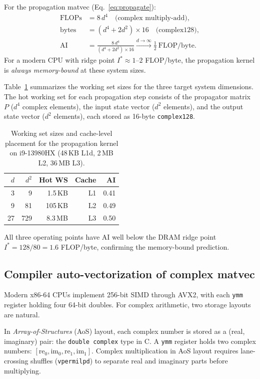 \documentclass[final,3p,times,twocolumn]{elsarticle}
\begin{document}
For the propagation matvec (Eq.~\eqref{eq:propagate}):
\begin{align}
  \text{FLOPs} &= 8\,d^4 \quad \text{(complex multiply-add)}, \\
  \text{bytes} &= (d^4 + 2d^2) \times 16 \quad \text{(complex128)}, \\
  \text{AI}    &= \frac{8\,d^4}{(d^4 + 2d^2) \times 16}
                \xrightarrow{d \to \infty} \frac{1}{2}\ \text{FLOP/byte}.
\end{align}
%
For a modern CPU with ridge point $I^* \approx 1$--$2$ FLOP/byte, the
propagation kernel is \emph{always memory-bound} at these system sizes.

Table~\ref{tab:working_set} summarizes the working set sizes for the three
target system dimensions. The hot working set for each propagation step
consists of the propagator matrix $P$ ($d^4$ complex elements), the input
state vector ($d^2$ elements), and the output state vector ($d^2$ elements),
each stored as 16-byte \texttt{complex128}.

\begin{table}[t]
  \centering
  \caption{Working set sizes and cache-level placement for the propagation
           kernel on i9-13980HX (48\,KB L1d, 2\,MB L2, 36\,MB L3).}
  \label{tab:working_set}
  \begin{tabular}{@{}rrrrr@{}}
    \toprule
    $d$ & $d^2$ & Hot WS & Cache & AI \\
    \midrule
    3  & 9   & 1.5\,KB   & L1  & 0.41 \\
    9  & 81  & 105\,KB   & L2  & 0.49 \\
    27 & 729 & 8.3\,MB   & L3  & 0.50 \\
    \bottomrule
  \end{tabular}
\end{table}

All three operating points have AI well below the DRAM ridge point
$I^* = 128/80 = 1.6$ FLOP/byte, confirming the memory-bound prediction.

\subsection{Compiler auto-vectorization of complex matvec}
\label{sec:autovec_bg}

Modern x86-64 CPUs implement 256-bit SIMD through AVX2, with each
\texttt{ymm} register holding four 64-bit doubles. For complex arithmetic,
two storage layouts are natural.

In \emph{Array-of-Structures} (AoS) layout, each complex number is stored
as a (real, imaginary) pair: the \texttt{double complex} type in C. A
\texttt{ymm} register holds two complex numbers:
$[\mathrm{re}_0, \mathrm{im}_0, \mathrm{re}_1, \mathrm{im}_1]$. Complex
multiplication in AoS layout requires lane-crossing shuffles
(\texttt{vpermilpd}) to separate real and imaginary parts before multiplying.
\end{document}
